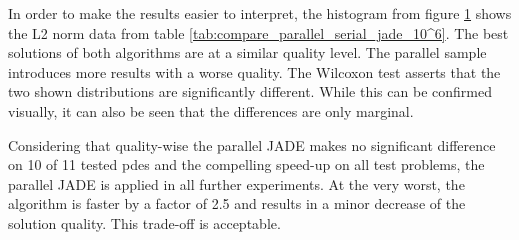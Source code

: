 \documentclass[./\jobname.tex]{subfiles}
\begin{document}
In order to make the results easier to interpret, the histogram from figure \ref{fig:pde4_ex0_ex1_histogram} shows the L2 norm data from table \ref{tab:compare_parallel_serial_jade_10^6}. The best solutions of both algorithms are at a similar quality level. The parallel sample introduces more results with a worse quality. The Wilcoxon test asserts that the two shown distributions are significantly different. While this can be confirmed visually, it can also be seen that the differences are only marginal. 
\begin{figure}[h]
	\centering
	\noindent{}
	\label{fig:pde4_ex0_ex1_histogram}
\end{figure}
Considering that quality-wise the parallel JADE makes no significant difference on 10 of 11 tested \gls{pde}s and the compelling speed-up on all test problems, the parallel JADE is applied in all further experiments. At the very worst, the algorithm is faster by a factor of 2.5 and results in a minor decrease of the solution quality. This trade-off is acceptable.
\end{document}
